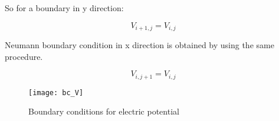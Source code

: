 \begin{doublespace}
So for a boundary in y direction:

\begin{equation}
V_{i+1,j}=V_{i,j}
\label{neumanny}
\end{equation}

Neumann boundary condition in x direction is obtained by using the same procedure.

\begin{equation}
V_{i,j+1}=V_{i,j}
\end{equation}

\begin{figure}[!htp]
\centering
\texttt{[image: bc\_V]}
\caption{Boundary conditions for electric potential } 
\label{bc_V}
\end{figure}

\end{doublespace}
